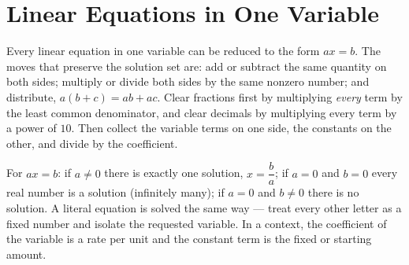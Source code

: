 \chapter{Linear Equations in One Variable}

\begin{essentials}
Every linear equation in one variable can be reduced to the form $ax=b$.
The moves that preserve the solution set are: add or subtract the same
quantity on both sides; multiply or divide both sides by the same nonzero
number; and distribute, $a(b+c)=ab+ac$. Clear fractions first by multiplying
\emph{every} term by the least common denominator, and clear decimals by
multiplying every term by a power of $10$. Then collect the variable terms on
one side, the constants on the other, and divide by the coefficient.

For $ax=b$: if $a\neq 0$ there is exactly one solution, $x=\dfrac{b}{a}$; if
$a=0$ and $b=0$ every real number is a solution (infinitely many); if $a=0$
and $b\neq 0$ there is no solution. A literal equation is solved the same
way --- treat every other letter as a fixed number and isolate the requested
variable. In a context, the coefficient of the variable is a rate per unit
and the constant term is the fixed or starting amount.
\end{essentials}

